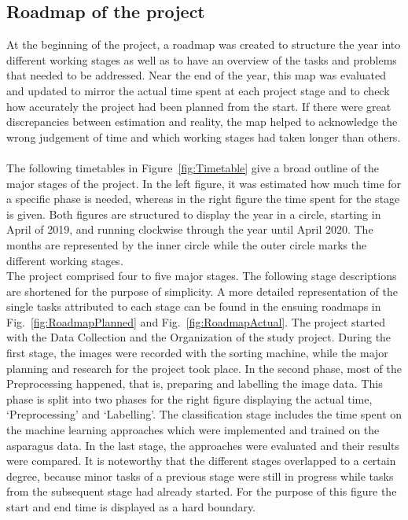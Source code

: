 \subsection{Roadmap of the project}

At the beginning of the project, a roadmap was created to structure the year into different working stages as well as to have an overview of the tasks and problems that needed to be addressed. Near the end of the year, this map was evaluated and updated to mirror the actual time spent at each project stage and to check how accurately the project had been planned from the start. If there were great discrepancies between estimation and reality, the map helped to acknowledge the wrong judgement of time and which working stages had taken longer than others. \\
\\
The following timetables in Figure~\ref{fig:Timetable} give a broad outline of the major stages of the project. In the left figure, it was estimated how much time for a specific phase is needed, whereas in the right figure the time spent for the stage is given. Both figures are structured to display the year in a circle, starting in April of 2019, and running clockwise through the year until April 2020. The months are represented by the inner circle while the outer circle marks the different working stages. \\
The project comprised four to five major stages. The following stage descriptions are shortened for the purpose of simplicity. A more detailed representation of the single tasks attributed to each stage can be found in the ensuing roadmaps in Fig.~\ref{fig:RoadmapPlanned} and Fig.~\ref{fig:RoadmapActual}. The project started with the Data Collection and the Organization of the study project. During the first stage, the images were recorded with the sorting machine, while the major planning and research for the project took place. In the second phase, most of the Preprocessing happened, that is, preparing and labelling the image data. This phase is split into two phases for the right figure displaying the actual time, ‘Preprocessing’ and ‘Labelling’. The classification stage includes the time spent on the machine learning approaches which were implemented and trained on the asparagus data. In the last stage, the approaches were evaluated and their results were compared. It is noteworthy that the different stages overlapped to a certain degree, because minor tasks of a previous stage were still in progress while tasks from the subsequent stage had already started. For the purpose of this figure the start and end time is displayed as a hard boundary. \\

